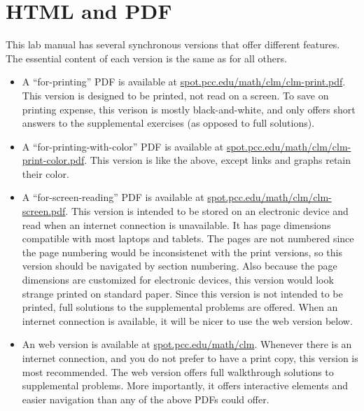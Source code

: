 \documentclass[12pt,]{book}
\theoremstyle{plain}
\theoremstyle{definition}
\numberwithin{equation}{section}
\begin{document}
\chapter*{HTML and PDF}\label{versions}
This lab manual has several synchronous versions that offer different features. The essential content of each version is the same as for all others.%
\begin{itemize}[label=\textbullet]
\item{}A ``for-printing'' PDF is available at \url{spot.pcc.edu/math/clm/clm-print.pdf}. This version is designed to be printed, not read on a screen. To save on printing expense, this verison is mostly black-and-white, and only offers short answers to the supplemental exercises (as opposed to full solutions).%
\item{}A ``for-printing-with-color'' PDF is available at \url{spot.pcc.edu/math/clm/clm-print-color.pdf}. This version is like the above, except links and graphs retain their color.%
\item{}A ``for-screen-reading'' PDF is available at \url{spot.pcc.edu/math/clm/clm-screen.pdf}. This version is intended to be stored on an electronic device and read when an internet connection is unavailable. It has page dimensions compatible with most laptops and tablets. The pages are not numbered since the page numbering would be inconsistenet with the print versions, so this version should be navigated by section numbering. Also because the page dimensions are customized for electronic devices, this version would look strange printed on standard paper. Since this version is not intended to be printed, full solutions to the supplemental problems are offered. When an internet connection is available, it will be nicer to use the web version below.%
\item{}An web version is available at \url{spot.pcc.edu/math/clm}. Whenever there is an internet connection, and you do not prefer to have a print copy, this version is most recommended. The web version offers full walkthrough solutions to supplemental problems. More importantly, it offers interactive elements and easier navigation than any of the above PDFs could offer.%
\end{itemize}
\end{document}

